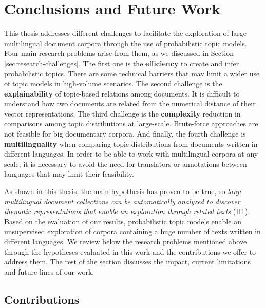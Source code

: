

\chapter{Conclusions and Future Work}\label{ch:conclusion}

\graphicspath{{conclusions/figures/}}

This thesis addresses different challenges to facilitate the exploration of large multilingual document corpora through the use of probabilistic topic models. Four main research problems arise from them, as we discussed in Section \ref{sec:research-challenges}. The first one is the \textbf{efficiency} to create and infer probabilistic topics. There are some technical barriers that may limit a wider use of topic models in high-volume scenarios. The second challenge is the \textbf{explainability} of topic-based relations among documents. It is difficult to understand how two documents are related from the numerical distance of their vector representations. The third challenge is the \textbf{complexity} reduction in comparisons among topic distributions at large-scale. Brute-force approaches are not feasible for big documentary corpora. And finally, the fourth challenge is \textbf{multilinguality} when comparing topic distributions from documents written in different languages. In order to be able to work with multilingual corpora at any scale, it is necessary to avoid the need for translators or annotations between languages that may limit their feasibility.

As shown in this thesis, the main hypothesis has proven to be true, so \textit{large multilingual document collections can be automatically analyzed to discover thematic representations that enable an exploration through related texts} (H1). Based on the evaluation of our results, probabilistic topic models enable an unsupervised exploration of corpora containing a huge number of texts written in different languages. We review below the research problems mentioned above through the hypotheses evaluated in this work and the contributions we offer to address them. The rest of the section discusses the impact, current limitations and future lines of our work. 


\section{Contributions}


